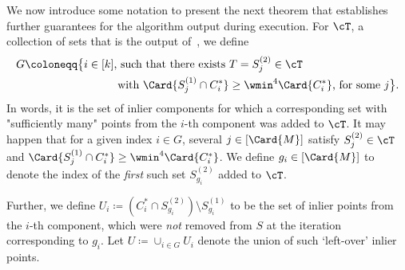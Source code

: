 We now introduce some notation to present the next theorem that establishes further guarantees for the algorithm output during execution.  For \(\cT\), a collection of sets that is the output of~, we define
\begin{equation}
\label{eq:set-G-def}
\begin{aligned}
G \coloneqq \big\{i \in [k] &\text{, such that there exists } T = S_j^{(2)} \in \cT \\
 &\text{ with } \Card{S_{j}^{(1)} \cap C^*_i} \geq \wmin^4 \Card{C^*_i} \text{, for some }j\big\}. 
\end{aligned}
\end{equation}
In words, it is the set of inlier components for which a corresponding set with "sufficiently many" points from the $i$-th component was added to $\cT$.
It may happen that for a given index \(i \in G\), several \(j \in [\Card{M}]\) satisfy \(S_j^{(2)} \in \cT\) and \(\Card{S_{j}^{(1)} \cap C^*_i} \geq \wmin^4 \Card{C^*_i}\). We define \(g_i \in [\Card{M}]\) to denote the index of the \emph{first} such set \(S_{g_i}^{(2)}\) added to \(\cT\). 

Further, we define \(U_i \coloneqq (C^*_i \cap S^{(2)}_{g_i}) \setminus S^{(1)}_{g_i}\) to be the set of inlier points from the \(i\)-th component, which were \emph{not} removed from $S$ at the iteration corresponding to \(g_i\). Let \(U \coloneqq \cup_{i \in G} U_i\) denote the union of such `left-over' inlier points.

